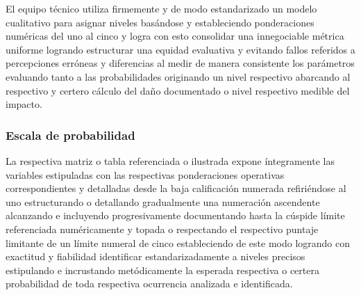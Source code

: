\documentclass[11pt,spanish]{article}
\begin{document}
El equipo técnico utiliza firmemente y de modo estandarizado un modelo cualitativo para asignar niveles basándose y estableciendo ponderaciones numéricas del uno al cinco y logra con esto consolidar una innegociable métrica uniforme logrando estructurar una equidad evaluativa y evitando fallos referidos a percepciones erróneas y diferencias al medir de manera consistente los parámetros evaluando tanto a las probabilidades originando un nivel respectivo abarcando al respectivo y certero cálculo del daño documentado o nivel respectivo medible del impacto.

\subsubsection{Escala de probabilidad}

La respectiva matriz o tabla referenciada o ilustrada expone íntegramente las variables estipuladas con las respectivas ponderaciones operativas correspondientes y detalladas desde la baja calificación numerada refiriéndose al uno estructurando o detallando gradualmente una numeración ascendente alcanzando e incluyendo progresivamente documentando hasta la cúspide límite referenciada numéricamente y topada o respectando el respectivo puntaje limitante de un límite numeral de cinco estableciendo de este modo logrando con exactitud y fiabilidad identificar estandarizadamente a niveles precisos estipulando e incrustando metódicamente la esperada respectiva o certera probabilidad de toda respectiva ocurrencia analizada e identificada.
\end{document}

